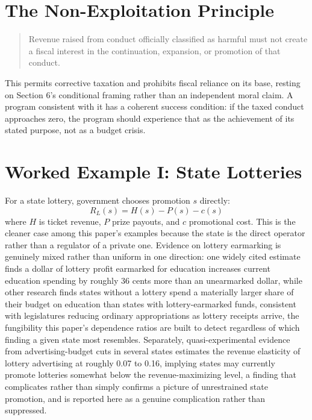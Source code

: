 \documentclass[11pt]{article}
\begin{document}
\section{The Non-Exploitation Principle}

\begin{quote}
Revenue raised from conduct officially classified as harmful must not create a fiscal interest in the continuation, expansion, or promotion of that conduct.
\end{quote}

This permits corrective taxation and prohibits fiscal reliance on its base, resting on Section 6's conditional framing rather than an independent moral claim. A program consistent with it has a coherent success condition: if the taxed conduct approaches zero, the program should experience that as the achievement of its stated purpose, not as a budget crisis.

\section{Worked Example I: State Lotteries}

For a state lottery, government chooses promotion $s$ directly:
\[
R_L(s) = H(s) - P(s) - c(s)
\]
where $H$ is ticket revenue, $P$ prize payouts, and $c$ promotional cost. This is the cleaner case among this paper's examples because the state is the direct operator rather than a regulator of a private one. Evidence on lottery earmarking is genuinely mixed rather than uniform in one direction: one widely cited estimate finds a dollar of lottery profit earmarked for education increases current education spending by roughly 36 cents more than an unearmarked dollar, while other research finds states without a lottery spend a materially larger share of their budget on education than states with lottery-earmarked funds, consistent with legislatures reducing ordinary appropriations as lottery receipts arrive, the fungibility this paper's dependence ratios are built to detect regardless of which finding a given state most resembles. Separately, quasi-experimental evidence from advertising-budget cuts in several states estimates the revenue elasticity of lottery advertising at roughly 0.07 to 0.16, implying states may currently promote lotteries somewhat below the revenue-maximizing level, a finding that complicates rather than simply confirms a picture of unrestrained state promotion, and is reported here as a genuine complication rather than suppressed.
\end{document}

